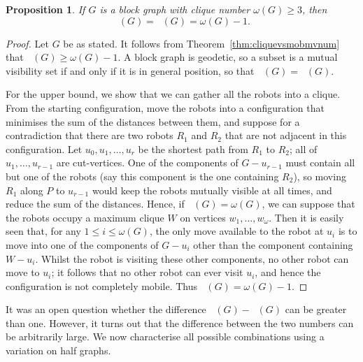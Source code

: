 \documentclass[a4paper,12pt]{article}
\DeclareMathOperator{\mob}{Mob_{gp}}
\DeclareMathOperator{\cmobmv}{Mob^*_{\mu}}
\DeclareMathOperator{\cmob}{Mob^*_{gp}}
\newtheorem{proposition}[theorem]{Proposition}
\theoremstyle{definition}
\begin{document}
	\begin{proposition}\label{prop:blockgraph cmobmv}
		If $G$ is a block graph with clique number $\omega (G) \geq 3$, then \[ \cmob (G) = \cmobmv (G) = \omega (G) -1.\]
	\end{proposition}
	\begin{proof}
		Let $G$ be as stated. It follows from Theorem~\ref{thm:cliquevsmobmvnum} that $\cmobmv (G) \geq \omega (G) - 1$. A block graph is geodetic, so a subset is a mutual visibility set if and only if it is in general position, so that $\cmobmv (G) = \cmob (G)$. 
		
		For the upper bound, we show that we can gather all the robots into a clique. From the starting configuration, move the robots into a configuration that minimises the sum of the distances between them, and suppose for a contradiction that there are two robots $R_1$ and $R_2$ that are not adjacent in this configuration. Let $u_0,u_1,\dots ,u_r$ be the shortest path from $R_1$ to $R_2$; all of $u_1,\dots ,u_{r-1}$ are cut-vertices. One of the components of $G-u_{r-1}$ must contain all but one of the robots (say this component is the one containing $R_2$), so moving $R_1$ along $P$ to $u_{r-1}$ would keep the robots mutually visible at all times, and reduce the sum of the distances. Hence, if $\cmobmv (G) = \omega (G)$, we can suppose that the robots occupy a maximum clique $W$ on vertices $w_1,\dots ,w_{\omega }$. Then it is easily seen that, for any $1 \leq i \leq \omega (G)$, the only move available to the robot at $u_i$ is to move into one of the components of $G-u_i$ other than the component containing $W-u_i$. Whilst the robot is visiting these other components, no other robot can move to $u_i$; it follows that no other robot can ever visit $u_i$, and hence the configuration is not completely mobile. Thus $\cmobmv (G) = \omega (G) - 1$.
	\end{proof}
	
	It was an open question whether the difference $\mob (G) - \cmob(G)$ can be greater than one. However, it turns out that the difference between the two numbers can be arbitrarily large. We now characterise all possible combinations using a variation on half graphs.
	
\end{document}
